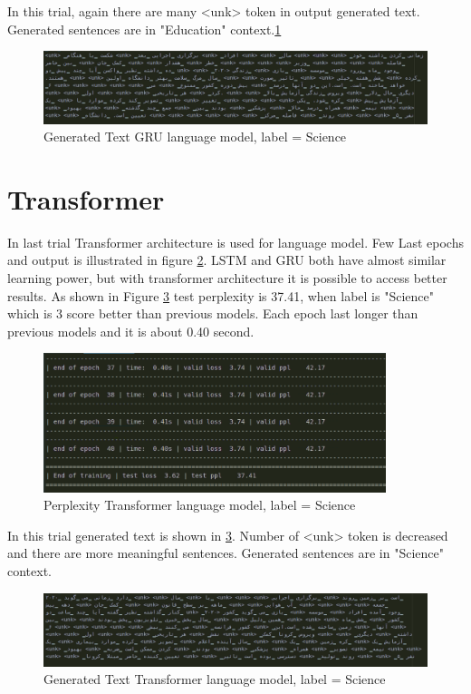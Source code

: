 In this trial, again there are many <unk> token in output generated text. Generated sentences are in "Education" context.\ref{fig:gru_edu_out}

\begin{figure}
	\centering
	\includegraphics[width=15cm]{images/gru_danesh_out.png}
	\caption{Generated Text GRU language model, label = Science}
	\label{fig:gru_edu_out}
\end{figure}

\section{Transformer}
In last trial Transformer architecture is used for language model. Few Last epochs and output is illustrated in figure \ref{fig:transformer_edu}. LSTM and GRU both have almost similar learning power, but with transformer architecture it is possible to access better results. As shown in Figure \ref{fig:transformer_edu_out} test perplexity is 37.41, when label is "Science" which is 3 score better than previous models. Each epoch last longer than previous models and it is about 0.40 second.
 
\begin{figure}
	\centering
	\includegraphics[width=10cm]{images/transformer_danesh.png}
	\caption{Perplexity Transformer language model, label = Science}
	\label{fig:transformer_edu}
\end{figure}

In this trial generated text is shown in \ref{fig:transformer_edu_out}. Number of <unk> token is decreased and there are more meaningful sentences. Generated sentences are in "Science" context.
\begin{figure}
	\centering
	\includegraphics[width=15cm]{images/transformer_danesh_out.png}
	\caption{Generated Text Transformer language model, label = Science}
	\label{fig:transformer_edu_out}
\end{figure}

